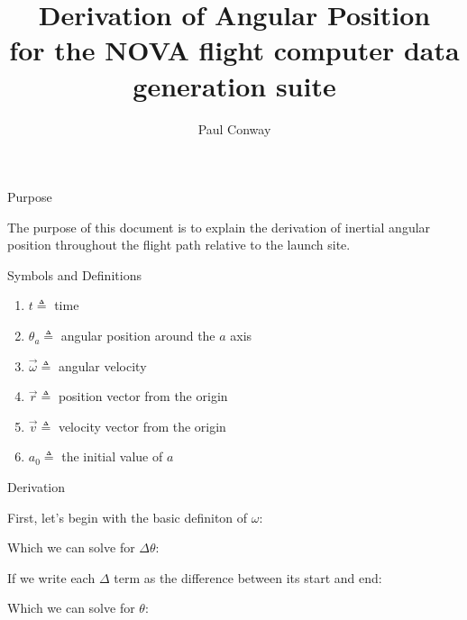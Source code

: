 \documentclass[12pt, letterpaper]{article}
\title{Derivation of Angular Position\\ \large for the NOVA flight computer data generation suite}
\author{Paul Conway}
\begin{document}
\noindent
\maketitle

\bigskip
\begin{center}
\large Purpose
\end{center}
The purpose of this document is to explain the derivation of inertial angular position throughout the flight path relative to the launch site.
\pagebreak


\begin{center}
\large Symbols and Definitions
\end{center}
\begin{enumerate}
\item $t \triangleq$ time
\item $\theta _{a} \triangleq$ angular position around the $a$ axis
\item $\vec{\omega} \triangleq$ angular velocity
\item $\vec{r} \triangleq$ position vector from the origin
\item $\vec{v} \triangleq$ velocity vector from the origin
\item $a_{0} \triangleq$ the initial value of $a$
\end{enumerate}
\pagebreak


\begin{center}
\large Derivation
\end{center}
First, let's begin with the basic definiton of $\omega$:
\begin{center}
\end{center}
Which we can solve for $\Delta \theta$:
\begin{center}
\scalebox{1.25}{$\Delta \theta = \omega \Delta t$}
\end{center}
If we write each $\Delta$ term as the difference between its start and end:
\begin{center}
\end{center}
Which we can solve for $\theta$:
\begin{center}
\end{center}
\end{document}
